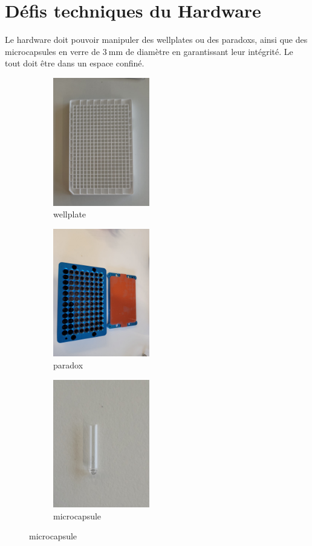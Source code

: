 \section{Défis techniques du Hardware}
Le hardware doit pouvoir manipuler des \glspl{wellplate} ou des \glspl{paradox}, ainsi que des \glspl{microcapsule} en verre de $\qty{3}{\mm}$ de diamètre en garantissant leur intégrité. Le tout doit être dans un espace confiné.

\begin{figure}[H]
    \begin{subfigure}{0.3\textwidth}
        \includegraphics[width=\linewidth, height=5.6cm]{assets/figures/wellplate.jpeg}
        \caption{\gls{wellplate}}
        \label{img:wellplate}
    \end{subfigure}
    \hfill
    \begin{subfigure}{0.3\textwidth}
        \includegraphics[width=\linewidth, height=5.6cm]{assets/figures/paradox.jpeg}
        \caption{\gls{paradox}}
        \label{img:paradox}
    \end{subfigure}
    \hfill
    \begin{subfigure}{0.3\textwidth}
        \includegraphics[width=\linewidth, height=5.6cm]{assets/figures/microcapsule.jpeg}
        \caption{\gls{microcapsule}}
        \label{img:microcapsule}
    \end{subfigure}
\end{figure}
